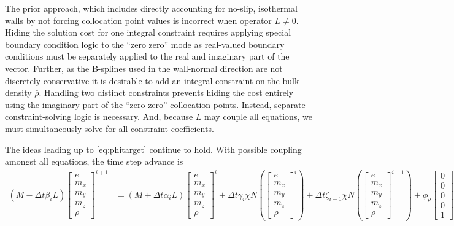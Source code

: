 \documentclass[letterpaper,11pt,nointlimits,reqno]{amsart}
\begin{document}
The prior approach, which includes directly accounting for no-slip, isothermal
walls by not forcing collocation point values is incorrect when operator $L
\neq 0$.  Hiding the solution cost for one integral constraint requires
applying special boundary condition logic to the ``zero zero'' mode as
real-valued boundary conditions must be separately applied to the real and
imaginary part of the vector.  Further, as the B-splines used in the
wall-normal direction are not discretely conservative it is desirable to add an
integral constraint on the bulk density $\bar{\rho}$.  Handling two distinct
constraints prevents hiding the cost entirely using the imaginary part of the
``zero zero'' collocation points.  Instead, separate constraint-solving logic
is necessary.  And, because $L$ may couple all equations, we must
simultaneously solve for all constraint coefficients.

The ideas leading up to \eqref{eq:phitarget} continue to hold.  With possible
coupling amongst all equations, the time step advance is
\begin{align}
  \left(M - \Delta{}t\beta_{i}L\right)
  \begin{bmatrix} e \\ m_x \\ m_y \\ m_z \\ \rho \end{bmatrix}^{i+1}
  &=
  \left(M + \Delta{}t\alpha_{i}L\right)
  \begin{bmatrix} e \\ m_x \\ m_y \\ m_z \\ \rho \end{bmatrix}^{i}
  + \Delta{}t\gamma_{i}\chi{}N\left(
  \begin{bmatrix} e \\ m_x \\ m_y \\ m_z \\ \rho \end{bmatrix}^{i}
  \right)
  + \Delta{}t\zeta_{i-1}\chi{}N\left(
  \begin{bmatrix} e \\ m_x \\ m_y \\ m_z \\ \rho \end{bmatrix}^{i-1}
  \right)
  + \phi_\rho
  \begin{bmatrix} 0 \\ 0 \\ 0 \\ 0 \\ 1 \end{bmatrix}
  + \phi_{m_x}
  \begin{bmatrix} u \\ 1 \\ 0 \\ 0 \\ 0 \end{bmatrix}
  .
\end{align}
\end{document}
